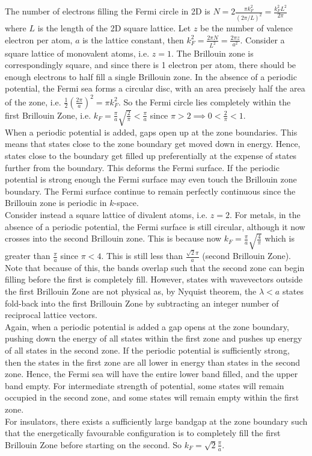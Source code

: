 \documentclass[a4paper]{article}
\begin{document}
\begin{eg}
The number of electrons filling the Fermi circle in 2D is $N=2\frac{\pi k_F^2}{(2\pi/L)^2}=\frac{k_F^2L^2}{2\pi}$ where $L$ is the length of the 2D square lattice. Let $z$ be the number of valence electron per atom, $a$ is the lattice constant, then $k_F^2=\frac{2\pi N}{L^2}=\frac{2\pi z}{a^2}$.
Consider a square lattice of monovalent atoms, i.e. $z=1$. The Brillouin zone is correspondingly square, and since there is 1 electron per atom, there should be enough electrons to half fill a single Brillouin zone. In the absence of a periodic potential, the Fermi sea forms a circular disc, with an area precisely half the area of the zone, i.e. $\frac{1}{2}(\frac{2\pi}{a})^2=\pi k_F^2$. So the Fermi circle lies completely within the first Brillouin Zone, i.e. $k_F=\frac{\pi}{a}\sqrt{\frac{2}{\pi}}<\frac{\pi}{a}$ since $\pi>2\implies0<\frac{2}{\pi}<1$.\\[5pt]
When a periodic potential is added, gaps open up at the zone boundaries. This means that states close to the zone boundary get moved down in energy. Hence, states close to the boundary get filled up preferentially at the expense of states further from the boundary. This deforms the Fermi surface. If the periodic potential is strong enough the Fermi surface may even touch the Brillouin zone boundary. The Fermi surface continue to remain perfectly continuous since the Brillouin zone is periodic in $k$-space.\\[5pt]
Consider instead a square lattice of divalent atoms, i.e. $z=2$. For metals, in the absence of a periodic potential, the Fermi surface is still circular, although it now crosses into the second Brillouin zone. This is because now $k_F=\frac{\pi}{a}\sqrt{\frac{4}{\pi}}$ which is greater than $\frac{\pi}{a}$ since $\pi<4$. This is still less than $\frac{\sqrt{2}\pi}{a}$ (second Brillouin Zone). Note that because of this, the bands overlap such that the second zone can begin filling before the first is completely fill. However, states with wavevectors outside the first Brillouin Zone are not physical as, by Nyquist theorem, the $\lambda<a$ states fold-back into the first Brillouin Zone by subtracting an integer number of reciprocal lattice vectors.\\[5pt]
Again, when a periodic potential is added a gap opens at the zone boundary, pushing down the energy of all states within the first zone and pushes up energy of all states in the second zone. If the periodic potential is sufficiently strong, then the states in the first zone are all lower in energy than states in the second zone. Hence, the Fermi sea will have the entire lower band filled, and the upper band empty. For intermediate strength of potential, some states will remain occupied in the second zone, and some states will remain empty within the first zone.\\[5pt]
For insulators, there exists a sufficiently large bandgap at the zone boundary such that the energetically favourable configuration is to completely fill the first Brillouin Zone before starting on the second. So $k_F=\sqrt{2}\frac{\pi}{a}$.
\end{eg}
\end{document}
